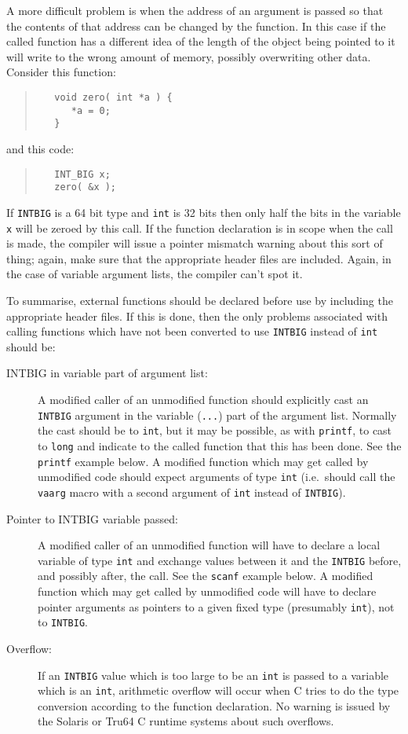 \documentclass[twoside,11pt]{article}
\renewcommand{\_}{\texttt{\symbol{95}}}
\newcommand{\cc}[1]{{\tt #1}}
\newenvironment{squote}{\begin{quote}\begin{small}}{\end{small}\end{quote}}
\begin{document}
A more difficult problem is when the address of an argument is
passed so that the contents of that address can be changed by
the function.  In this case if the called function has a
different idea of the length of the object being pointed to
it will write to the wrong amount of memory, possibly overwriting
other data.  Consider this function:
\begin{squote}
\begin{verbatim}
   void zero( int *a ) { 
      *a = 0; 
   }
\end{verbatim}
\end{squote}
and this code:
\begin{squote}
\begin{verbatim}
   INT_BIG x;
   zero( &x );
\end{verbatim}
\end{squote}
If \cc{INT\_BIG} is a 64 bit type and \cc{int} is 32 bits
then only half the bits in the variable \cc{x} will be zeroed by this call.
If the function declaration is in scope when the call is made,
the compiler will issue a pointer mismatch warning about this sort of thing; 
again, make sure that the appropriate header files are included.
Again, in the case of variable argument lists, the compiler can't spot it.

To summarise, external functions should be declared before use by
including the appropriate header files.  If this is done, then the only
problems associated with calling functions which have not been
converted to use \cc{INT\_BIG} instead of \cc{int} should be:
\begin{description}
%
\item[INT\_BIG in variable part of argument list:]
A modified caller of an unmodified function should explicitly cast
an \cc{INT\_BIG} argument in the variable (\cc{...}) part of the argument
list.  
Normally the cast should be to \cc{int}, but it may be possible,
as with \cc{printf}, to cast to \cc{long} and indicate to the called
function that this has been done.
See the \cc{printf} example below.
A modified function which may get called by unmodified code
should expect arguments of type \cc{int}
(i.e.\ should call the \cc{va\_arg} macro with a second argument
of \cc{int} instead of \cc{INT\_BIG}).
%
\item[Pointer to INT\_BIG variable passed:]
A modified caller of an unmodified function will have to declare
a local variable of type \cc{int} and exchange values between it
and the \cc{INT\_BIG} before, and possibly after, the call.
See the \cc{scanf} example below.
A modified function which may get called by unmodified code 
will have to declare pointer arguments as pointers to a given fixed
type (presumably \cc{int}), not to \cc{INT\_BIG}.
\item[Overflow:]
If an \cc{INT\_BIG} value which is too large to be an \cc{int}
is passed to a variable which is an \cc{int}, arithmetic overflow will
occur when C tries to do the type conversion according to the function
declaration.
No warning is issued by the Solaris or Tru64 C runtime systems about
such overflows.
\end{description}
\end{document}
